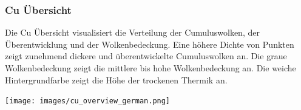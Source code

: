 \documentclass[11pt,a4paper]{article}
\begin{document}


\subsubsection{Cu Übersicht}\label{subsec:cu_overview}
Die Cu Übersicht visualisiert die Verteilung der Cumuluswolken, der Überentwicklung und der Wolkenbedeckung. Eine höhere Dichte von Punkten zeigt zunehmend dickere und überentwickelte Cumuluswolken an. Die graue Wolkenbedeckung zeigt die mittlere bis hohe Wolkenbedeckung an. Die weiche Hintergrundfarbe zeigt die Höhe der trockenen Thermik an. 
\begin{center}
\texttt{[image: images/cu\_overview\_german.png]}
\end{center}
\end{document}
